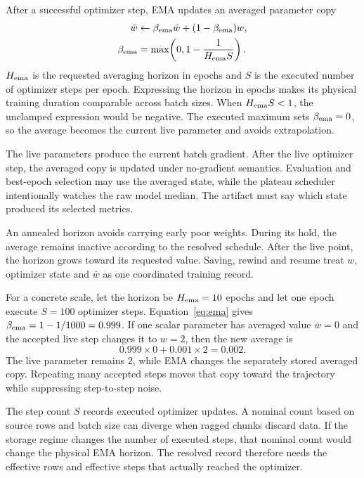 \documentclass[10pt,aps,prd,twocolumn,nofootinbib]{revtex4-2}
\begin{document}
After a successful optimizer step, EMA updates an averaged parameter copy
\begin{equation}
\begin{aligned}
 \bar w&\leftarrow\beta_{\rm ema}\bar w
 +(1-\beta_{\rm ema})w,\\
 \beta_{\rm ema}&=\max\!\left(0,1-\frac{1}{H_{\rm ema}S}\right).
\end{aligned}
 \label{eq:ema}
\end{equation}
\(H_{\rm ema}\) is the requested averaging horizon in epochs and \(S\) is the
executed number of optimizer steps per epoch.  Expressing the horizon in epochs makes its
physical training duration comparable across batch sizes.
When $H_{\rm ema}S<1$, the unclamped expression would be negative.  The executed
maximum sets $\beta_{\rm ema}=0$, so the average becomes the current live
parameter and avoids extrapolation.

The live parameters produce the current batch gradient.  After the live
optimizer step, the averaged copy is updated under no-gradient semantics.
Evaluation and best-epoch selection may use the averaged state,
while the plateau scheduler intentionally watches the raw model median.  The
artifact must say which state produced its selected metrics.

An annealed horizon avoids carrying early poor weights.  During its hold, the
average remains inactive according to the resolved schedule.  After the live
point, the horizon grows toward its requested value.  Saving, rewind and
resume treat \(w\), optimizer state and \(\bar w\) as one coordinated
training record.

For a concrete scale, let the horizon be $H_{\rm ema}=10$ epochs and let one epoch
execute $S=100$ optimizer steps.  Equation~\eqref{eq:ema} gives
$\beta_{\rm ema}=1-1/1000=0.999$.  If one scalar parameter has averaged value
$\bar w=0$ and the accepted live step changes it to $w=2$, then the
new average is
\begin{equation*}
  0.999\times0+0.001\times2=0.002.
\end{equation*}
The live parameter remains $2$, while EMA changes the separately stored
averaged copy.  Repeating many accepted
steps moves that copy toward the trajectory while suppressing step-to-step
noise.

The step count $S$ records executed optimizer updates.  A nominal count based
on source rows and batch size can diverge when ragged chunks discard data.  If
the storage regime changes the number of executed steps, that nominal count
would change the physical EMA horizon.  The resolved record therefore needs
the effective rows and effective steps that actually reached the optimizer.
\end{document}
